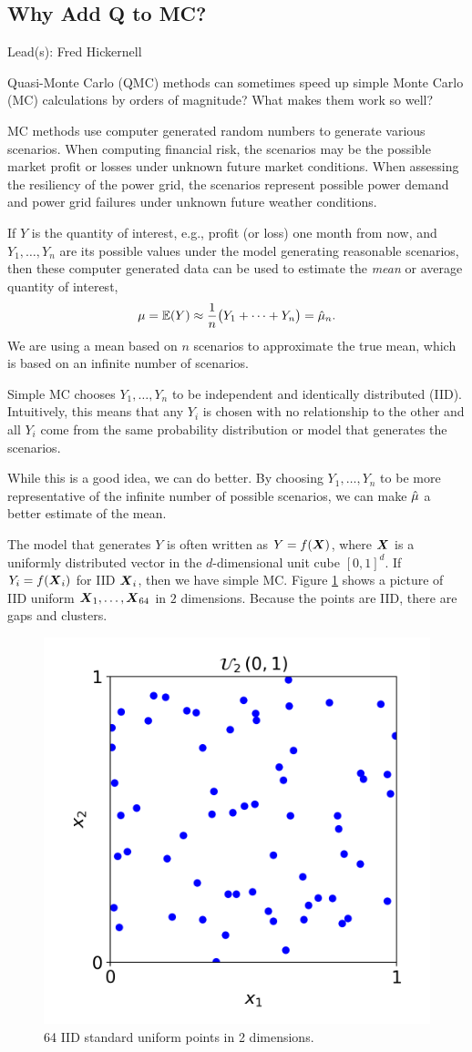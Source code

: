 \documentclass{article}
\newcommand{\blogpost}[3]{\begin{bibunit}[amsalpha]\newpage%
\section{#1} Lead(s): #2 \bigskip #3%
\putbib[FJH23,FJHown23]
\end{bibunit}%
} %
\begin{document}
\blogpost{Why Add Q to MC?}{Fred Hickernell}{\label{WhyQ}

Quasi-Monte Carlo (QMC) methods can sometimes speed up simple Monte Carlo (MC) calculations by orders of magnitude?  What makes them work so well?

MC methods use computer generated random numbers to generate various scenarios.  When computing financial risk, the scenarios may be the possible market profit or losses under unknown future market conditions.  When assessing the resiliency of the power grid, the scenarios represent possible power demand and power grid failures under unknown future weather conditions.

If $Y$ is the quantity of interest, e.g., profit (or loss) one month from now, and $Y_1, \ldots, Y_n$ are its possible values under the model generating reasonable scenarios, then these computer generated data can be used to estimate the \emph{mean} or average quantity of interest, 
\[
\mu = \operatorname{\mathbb{E}}(Y) \approx \frac 1n \bigl ( Y_1 + \cdots + Y_n \bigr) = \hat{\mu}_n.
\]
We are using a mean based on $n$ scenarios to approximate the true mean, which is based on an infinite number of scenarios.

Simple MC chooses $Y_1, \ldots, Y_n$ to be independent and identically distributed (IID).  Intuitively, this means that any $Y_i$ is chosen with no relationship to the other and all $Y_i$ come from the same probability distribution or model that generates the scenarios.

While this is a good idea, we can do better.  By choosing $Y_1, \ldots, Y_n$ to be more representative of the infinite number of possible scenarios, we can make $\hat{\mu}$ a better estimate of the mean.

The model that generates $Y$ is often written as $Y= f(\boldsymbol{X})$, where $\boldsymbol{X}$ is a uniformly distributed vector in the $d$-dimensional unit cube $[0,1]^d$.  If $Y_i = f(\boldsymbol{X}_i)$ for IID $\boldsymbol{X}_i$, then we have simple MC.  Figure \ref{fig:iid_pts} shows a picture of IID uniform  $\boldsymbol{X}_1, \ldots, \boldsymbol{X}_{64}$ in $2$ dimensions.  Because the points are IID, there are gaps and clusters.

\begin{figure}[ht!]
    \centering
    \includegraphics[width=.6\textwidth]{figures/iid_uniform_pts.png}
    \caption{64 IID standard uniform points in 2 dimensions.}
    \label{fig:iid_pts}
\end{figure}

}
\end{document}

